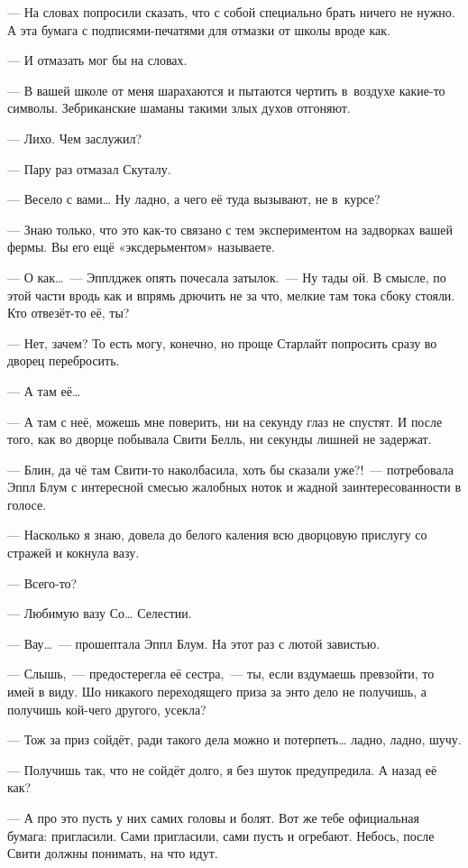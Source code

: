 \documentclass[fontsize=11pt,a5paper,titlepage=firstcover]{scrbook}
\begin{document}
--- На словах попросили сказать, что с собой специально брать ничего не нужно. А эта бумага с подписями-печатями для отмазки от школы вроде как.

--- И отмазать мог бы на словах.

--- В вашей школе от меня шарахаются и пытаются чертить в~воздухе какие-то символы. Зебриканские шаманы такими злых духов отгоняют.

--- Лихо. Чем заслужил?

--- Пару раз отмазал Скуталу.

--- Весело с вами{\ldots} Ну ладно, а чего её туда вызывают, не в~курсе?

--- Знаю только, что это как-то связано с тем экспериментом на задворках вашей фермы. Вы его ещё «эксдерьментом» называете.

--- О как{\ldots}~--- Эпплджек опять почесала затылок.~--- Ну тады ой. В смысле, по этой части вродь как и впрямь дрючить не за что, мелкие там тока сбоку стояли. Кто отвезёт-то её, ты?

--- Нет, зачем? То есть могу, конечно, но проще Старлайт попросить сразу во дворец перебросить.

--- А там её{\ldots}

--- А там с неё, можешь мне поверить, ни на секунду глаз не спустят. И после того, как во дворце побывала Свити Белль, ни секунды лишней не задержат.

--- Блин, да чё там Свити-то наколбасила, хоть бы сказали уже?!~--- потребовала Эппл Блум с интересной смесью жалобных ноток и жадной заинтересованности в голосе.

--- Насколько я знаю, довела до белого каления всю дворцовую прислугу со стражей и кокнула вазу.

--- Всего-то?

--- Любимую вазу Со{\ldots} Селестии.

--- Вау{\ldots}~--- прошептала Эппл Блум. На этот раз с лютой завистью.

--- Слышь,~--- предостерегла её сестра,~--- ты, если вздумаешь превзойти, то имей в виду. Шо никакого переходящего приза за энто дело не получишь, а получишь кой-чего другого, усекла?

--- Тож за приз сойдёт, ради такого дела можно и потерпеть{\ldots} ладно, ладно, шучу.

--- Получишь так, что не сойдёт долго, я без шуток предупредила. А назад её как?

--- А про это пусть у них самих головы и болят. Вот же тебе официальная бумага: пригласили. Сами пригласили, сами пусть и огребают. Небось, после Свити должны понимать, на что идут.
\end{document}
